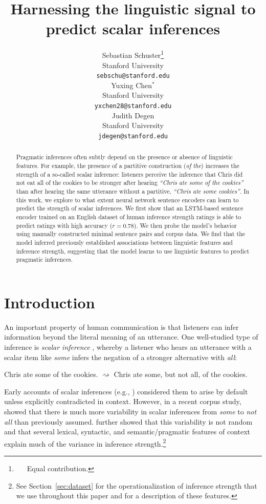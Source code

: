\documentclass[11pt,a4paper]{article}
\title{Harnessing the linguistic signal to predict scalar inferences}
\author{
  Sebastian Schuster\thanks{\ \ \ Equal contribution.} \\
  Stanford University \\
   {\small \texttt{sebschu@stanford.edu}}   \\\And
  Yuxing Chen${}^*$ \\
  Stanford University \\ 
  {\small \texttt{yxchen28@stanford.edu}} \\\And
  Judith Degen \\
  Stanford University \\
  {\small \texttt{jdegen@stanford.edu}}}
\begin{document}
\maketitle


\begin{abstract}

Pragmatic inferences often subtly depend on the presence or absence of linguistic features. For example, the presence of a partitive construction  (\emph{of the}) increases the strength of a so-called scalar inference: listeners perceive the inference that Chris did not eat all of the cookies to be stronger after hearing \emph{``Chris ate some of the cookies''} than after hearing the same utterance without a partitive, \emph{``Chris ate some cookies''}. In this work, we explore to what extent neural network sentence encoders can learn to predict the strength of scalar inferences. We first show that an LSTM-based sentence encoder trained on an English dataset of human inference strength ratings is able to predict ratings with high accuracy ($r=0.78$). We then probe the model's behavior using manually constructed minimal sentence pairs and corpus data. We find that the model inferred previously established associations between linguistic features and inference strength, suggesting that the model learns to use linguistic features to predict pragmatic inferences. 


\end{abstract}

\section{Introduction}

An important property of human communication is that listeners can {infer} information beyond the literal meaning of an utterance. One well-studied type of inference is \textit{scalar inference} \citep{Grice1975,Horn1984}, whereby a listener who hears an utterance with a scalar item like \textit{some} infers the negation of a stronger alternative with \textit{all}:

\begin{exe}
\small
\ex
\begin{xlist}
\ex \label{ex:cookie} Chris ate some of the cookies.
\ex \label{ex:cookie-inf} $\rightsquigarrow$ Chris ate some, but not all, of the cookies. 
\end{xlist}
\end{exe}


Early accounts of scalar inferences (e.g., \citealt{gazdar1979pragmatics,Horn1984,levinson2000presumptive}) considered them to arise by default unless explicitly contradicted in context. However, in a recent corpus study,  showed that there is much more variability in scalar inferences from \textit{some} to \emph{not all} than previously assumed.  further showed that this variability is not random and that several lexical, syntactic, and semantic/pragmatic features of context explain much of the variance in inference strength.\footnote{See Section~\ref{sec:dataset} for the operationalization of inference strength that we use throughout this paper and for a description of these features.}
\end{document}
